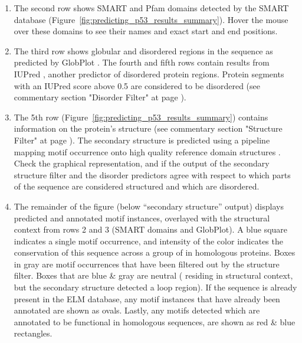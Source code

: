 \documentclass[12pt]{article}
\begin{document}
\begin{enumerate}
\item The second row shows SMART and Pfam domains detected by the SMART
	database \citep{9600884, 25300481, 9600884}
	(Figure~\ref{fig:predicting_p53_results_summary}). Hover the
	mouse over these domains to see their names and exact start and end
	positions.


\item The third row shows globular and disordered regions in the
	sequence as predicted by GlobPlot \citep{12824398}. The fourth
	and fifth rows
	contain results from IUPred \citep{15955779}, another
	predictor of disordered protein regions. Protein segments with
	an IUPred score above 0.5 are considered to be disordered 
	(see commentary section "Disorder Filter" at page \pageref{DisorderFilter}).


\item The 5th row (Figure~\ref{fig:predicting_p53_results_summary}) contains
	information on the protein's structure (see commentary section "Structure Filter" at page \pageref{StructureFilter}). The secondary structure is
	predicted using a pipeline mapping motif occurrence onto high quality
	reference domain structures \citep{19852836}. Check the graphical
	representation, and if the output of the secondary structure filter and
	the disorder predictors agree with respect to which parts of the
	sequence are considered structured and which are disordered.

\item The remainder of the figure (below ``secondary structure'' output)
	displays predicted and annotated motif instances, overlayed with the
	structural context from rows 2 and 3 (SMART domains and GlobPlot). A
	blue square indicates a single motif occurrence, and intensity of the
	color indicates the conservation of this sequence across a group of in
	homologous proteins.
	Boxes in gray are motif occurrences that have been filtered out by the
	structure filter. Boxes that are blue \& gray are neutral (
	residing in structural context, but the secondary structure detected a
	loop region). If the sequence is already present in the ELM database,
	any motif instances that have already been annotated are shown as
	ovals. Lastly, any motifs detected which are annotated to be
	functional in homologous sequences, are shown as red \& blue
	rectangles.


\end{enumerate}
\end{document}
